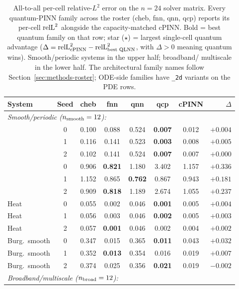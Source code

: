 \begin{table}[t]
\centering
\caption{All-to-all per-cell relative-$L^2$ error on the $n=24$
solver matrix. Every quantum-PINN family across the
roster (cheb, fnn, qnn, qcp) reports its per-cell
$\mathrm{relL}^2$ alongside the capacity-matched cPINN. Bold = best
quantum family on that row; star ($\star$) = largest single-cell
quantum advantage ($\Delta = \mathrm{relL}^2_\text{cPINN} -
\mathrm{relL}^2_\text{best QLNN}$, with $\Delta > 0$ meaning quantum
wins). Smooth/periodic systems in the upper half; broadband/
multiscale in the lower half. The architectural family names
follow Section~\ref{sec:methods-roster}; ODE-side families have
\texttt{\_2d} variants on the PDE rows.}
\label{tab:cell-matrix}
\footnotesize
\setlength{\tabcolsep}{4pt}
\begin{tabular}{lc|cccc|cr}
\toprule
System & Seed & cheb & fnn & qnn & qcp & cPINN & $\Delta$ \\
\midrule
\multicolumn{8}{l}{\emph{Smooth/periodic ($n_{\mathrm{smooth}} = 12$):}} \\
\lv{}          & 0 & 0.100 & 0.088 & 0.524 & \textbf{0.007} & 0.012 & $+0.004$ \\
\lv{}          & 1 & 0.116 & 0.141 & 0.523 & \textbf{0.003} & 0.008 & $+0.005$ \\
\lv{}          & 2 & 0.102 & 0.141 & 0.524 & \textbf{0.007} & 0.007 & $+0.000$ \\
\vdp{}         & 0 & 0.906 & \textbf{0.821} & 1.180 & 3.402 & 1.157 & $+0.336$ \\
\vdp{}         & 1 & 1.152 & 0.865 & \textbf{0.762} & 0.867 & 0.943 & $+0.181$ \\
\vdp{}         & 2 & 0.909 & \textbf{0.818} & 1.189 & 2.674 & 1.055 & $+0.237$ \\
Heat           & 0 & 0.055 & 0.002 & 0.046 & \textbf{0.001} & 0.005 & $+0.004$ \\
Heat           & 1 & 0.056 & 0.003 & 0.046 & \textbf{0.002} & 0.005 & $+0.003$ \\
Heat           & 2 & 0.057 & \textbf{0.001} & 0.046 & 0.002 & 0.004 & $+0.002$ \\
Burg.\ smooth  & 0 & 0.347 & 0.015 & 0.365 & \textbf{0.011} & 0.043 & $+0.032$ \\
Burg.\ smooth  & 1 & 0.352 & \textbf{0.013} & 0.354 & 0.016 & 0.019 & $+0.007$ \\
Burg.\ smooth  & 2 & 0.374 & 0.025 & 0.356 & \textbf{0.021} & 0.019 & $-0.002$ \\
\midrule
\multicolumn{8}{l}{\emph{Broadband/multiscale ($n_{\mathrm{broad}} = 12$):}} \\

\end{tabular}
\end{table}
